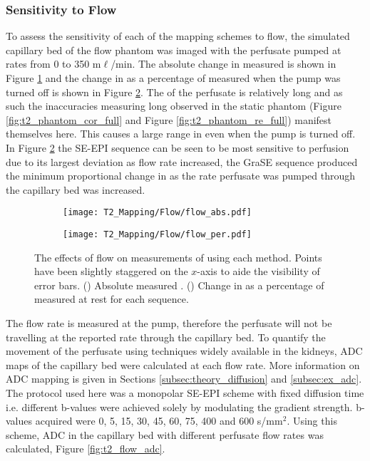 \subsubsection{Sensitivity to Flow}

To assess the sensitivity of each of the \ttwo mapping schemes to flow, the simulated capillary bed of the flow phantom was imaged with the perfusate pumped at rates from 0 to 350 m$\ell$/min. The absolute change in measured \ttwo is shown in Figure \ref{fig:t2_flow_abs} and the change in \ttwo as a percentage of \ttwo measured when the pump was turned off is shown in Figure \ref{fig:t2_flow_percent}. The \ttwo of the perfusate is relatively long and as such the inaccuracies measuring long \ttwo observed in the static phantom (Figure \ref{fig:t2_phantom_cor_full} and Figure \ref{fig:t2_phantom_re_full}) manifest themselves here. This causes a large range in \ttwo even when the pump is turned off. In Figure \ref{fig:t2_flow_percent} the \ac{SE}-\ac{EPI} sequence can be seen to be most sensitive to perfusion due to its largest deviation as flow rate increased, the \ac{GraSE} sequence produced the minimum proportional change in \ttwo as the rate perfusate was pumped through the capillary bed was increased.
\begin{figure}[H]
	\centering
	\begin{subfigure}[c]{0.47\textwidth}
		\centering
		\texttt{[image: T2\_Mapping/Flow/flow\_abs.pdf]}
		\caption{}
		\label{fig:t2_flow_abs}
	\end{subfigure}
	\hfill
	\begin{subfigure}[c]{0.47\textwidth}
		\centering
		\texttt{[image: T2\_Mapping/Flow/flow\_per.pdf]}
		\caption{}
		\label{fig:t2_flow_percent}
	\end{subfigure}
	\caption{The effects of flow on measurements of \ttwo using each method. Points have been slightly staggered on the $x$-axis to aide the visibility of error bars. () Absolute measured \ttwo. () Change in \ttwo as a percentage of \ttwo measured at rest for each sequence.}
	\label{fig:t2_flow}
\end{figure}

The flow rate is measured at the pump, therefore the perfusate will not be travelling at the reported rate through the capillary bed. To quantify the movement of the perfusate using techniques widely available in the kidneys, \ac{ADC} maps of the capillary bed were calculated at each flow rate. More information on \ac{ADC} mapping is given in Sections \ref{subsec:theory_diffusion} and \ref{subsec:ex_adc}. The protocol used here was a monopolar \ac{SE}-\ac{EPI} scheme with fixed diffusion time i.e. different b-values were achieved solely by modulating the gradient strength. b-values acquired were 0, 5, 15, 30, 45, 60, 75, 400 and 600 s/mm$^2$. Using this scheme, \ac{ADC} in the capillary bed with different perfusate flow rates was calculated, Figure \ref{fig:t2_flow_adc}. 

